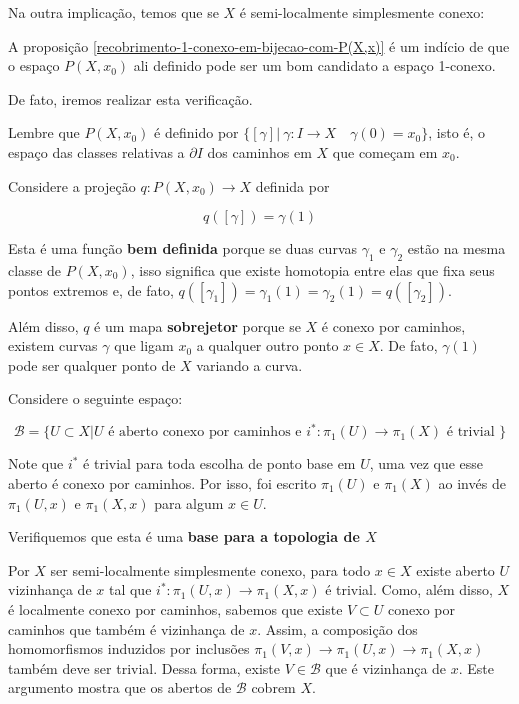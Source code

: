 \begin{dem}
    Na outra implicação, temos que se $X$ é semi-localmente simplesmente conexo:\newline
    
    A proposição \ref{recobrimento-1-conexo-em-bijecao-com-P(X,x)} é um indício de que o espaço $P(X,x_0)$ ali definido pode ser um bom candidato a espaço 1-conexo.

    De fato, iremos realizar esta verificação. 

    Lembre que $P(X,x_0)$ é definido por $\{[\gamma]| ~\gamma:I\rightarrow X\text{ ~ }\gamma(0)=x_0\}$, isto é, o espaço das classes relativas a $\partial I$ dos caminhos em $X$ que começam em $x_0$.

    Considere a projeção $q: P(X,x_0)\rightarrow X$ definida por 

    $$q([\gamma])=\gamma(1)$$

    Esta é uma função \textbf{bem definida} porque se duas curvas $\gamma_1$ e $\gamma_2$ estão na mesma classe de $P(X,x_0)$, isso significa que existe homotopia entre elas que fixa seus pontos extremos e, de fato, $q([\gamma_1])=\gamma_1(1)=\gamma_2(1)=q([\gamma_2])$.

    Além disso, $q$ é um mapa \textbf{sobrejetor} porque se $X$ é conexo por caminhos, existem curvas $\gamma$ que ligam $x_0$ a qualquer outro ponto $x\in X$. De fato, $\gamma(1)$ pode ser qualquer ponto de $X$ variando a curva.

    Considere o seguinte espaço:

    $$\mathcal{B}=\{U\subset X | U \text{ é aberto conexo por caminhos e } i^*:\pi_1(U)\rightarrow \pi_1(X)\text{ é trivial }\}$$

    Note que $i^*$ é trivial para toda escolha de ponto base em $U$, uma vez que esse aberto é conexo por caminhos. Por isso, foi escrito $\pi_1(U)$ e  $\pi_1(X)$ ao invés de  $\pi_1(U,x)$ e  $\pi_1(X,x)$ para algum $x\in U$.

    Verifiquemos que esta é uma \textbf{base para a topologia de $X$}

     Por $X$ ser semi-localmente simplesmente conexo, para todo $x\in X$ existe aberto $U$ vizinhança de $x$ tal que $i^*:\pi_1(U,x)\rightarrow \pi_1(X,x)$ é trivial. Como, além disso, $X$ é localmente conexo por caminhos, sabemos que existe $V\subset U$ conexo por caminhos que também é vizinhança de $x$. Assim, a composição dos homomorfismos induzidos por inclusões $\pi_1(V,x)\rightarrow \pi_1(U,x)\rightarrow \pi_1(X,x)$ também deve ser trivial. Dessa forma, existe $V\in \mathcal{B}$ que é vizinhança de $x$. Este argumento mostra que os abertos de $\mathcal{B}$ cobrem $X$.


\end{dem}
